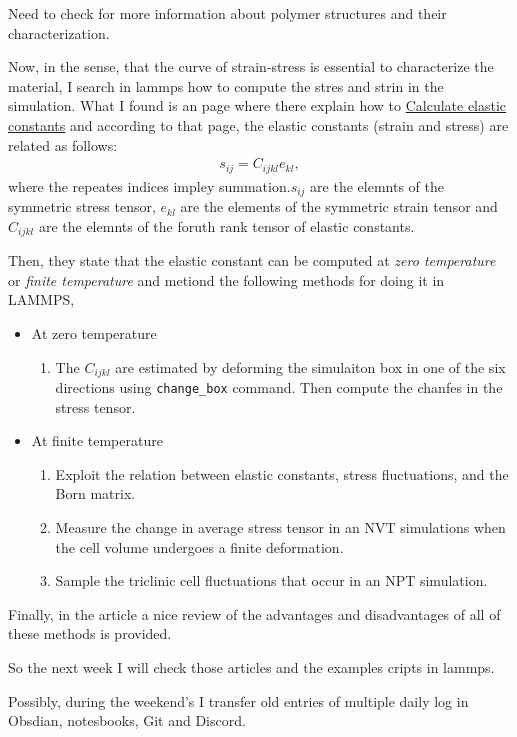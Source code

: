 \documentclass[a4paper, 11pt, oneside]{researchjournal} %
\begin{document}
Need to check \cite{dealyStructureRheologyMolten2006} for more information about polymer structures and their characterization.

Now, in the sense, that the curve of strain-stress is essential to characterize the material, I search in lammps how to compute the stres and strin in the simulation.
What I found is an page where there explain how to \href{https://docs.lammps.org/Howto_elastic.html}{Calculate elastic constants} and according to that page, the elastic constants (strain and stress) are related as follows:
\begin{gather*}
	s_{ij} = C_{ijkl} e_{kl},
\end{gather*}
where the repeates indices impley summation.$s_{ij}$ are the elemnts of the symmetric stress tensor, $e_{kl}$ are the elements of the symmetric strain tensor and $C_{ijkl}$ are the elemnts of the foruth rank tensor of elastic constants.

Then, they state that the elastic constant can be computed at \textit{zero temperature} or \textit{finite temperature} and metiond the following methods for doing it in LAMMPS,
\begin{itemize}
	\item At zero temperature
		\begin{enumerate}
			\item The $C_{ijkl}$ are estimated by deforming the simulaiton box in one of the six directions using \verb|change_box| command. Then compute the chanfes in the stress tensor.
		\end{enumerate}
	\item At finite temperature
		\begin{enumerate}
				\item Exploit the relation between elastic constants, stress fluctuations, and the Born matrix. \cite{rayStatisticalEnsemblesMolecular1984}
				\item Measure the change in average stress tensor in an NVT simulations when the cell volume undergoes a finite deformation.
				\item Sample the triclinic cell fluctuations that occur in an NPT simulation. 
			\end{enumerate}
\end{itemize}

Finally, in the article \cite{clavierComputationElasticConstants2017} a nice review of the advantages and disadvantages of all of these methods is provided.

So the next week I will check those articles and the examples cripts in lammps.

Possibly, during the weekend's I transfer old entries of multiple daily log in Obsdian, notesbooks, Git and Discord.





\end{document}
